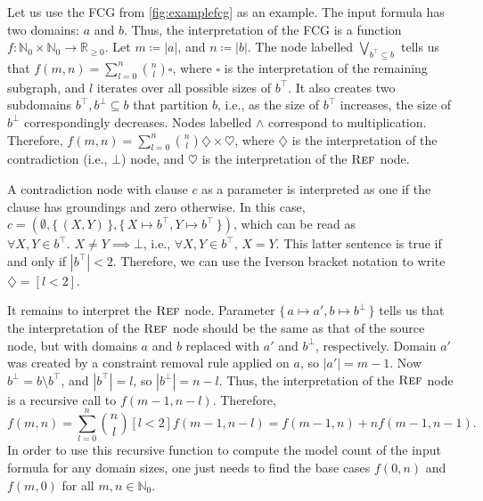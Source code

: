 \begin{example}\label{example:interpretation}
  Let us use the FCG from \cref{fig:examplefcg} as an example. The input formula
  has two domains: $a$ and $b$. Thus, the interpretation of the FCG is a
  function
  $f\colon \mathbb{N}_{0} \times \mathbb{N}_{0} \to \mathbb{R}_{\ge 0}$. Let
  $m \coloneqq |a|$, and $n \coloneqq |b|$. The node labelled
  $\bigvee_{b^{\top} \subseteq b}$ tells us that
  $f(m, n) = \sum_{l = 0}^{n} \binom{n}{l} \square$, where $\square$ is the
  interpretation of the remaining subgraph, and $l$ iterates over all possible
  sizes of $b^{\top}$. It also creates two subdomains
  $b^{\top}, b^{\bot} \subseteq b$ that partition $b$, i.e., as the size of
  $b^{\top}$ increases, the size of $b^{\bot}$ correspondingly decreases. Nodes
  labelled $\land$ correspond to multiplication. Therefore,
  $f(m, n) = \sum_{l = 0}^{n} \binom{n}{l} \diamondsuit \times \heartsuit$,
  where $\diamondsuit$ is the interpretation of the contradiction (i.e., $\bot$)
  node, and $\heartsuit$ is the interpretation of the $\operatorname{\textsc{Ref}}$ node.

  A contradiction node with clause $c$ as a parameter is interpreted as one if
  the clause has groundings and zero otherwise. In this case,
  $c = (\emptyset, \{\, (X, Y) \,\}, \{\, X \mapsto b^\top, Y \mapsto b^\top \,\})$,
  which can be read as $\forall X, Y \in b^{\top}\text{.
  }X \ne Y \implies \bot$, i.e., $\forall X, Y \in b^{\top}\text{, }X = Y$. This
  latter sentence is true if and only if $|b^{\top}| < 2$. Therefore, we can use
  the Iverson bracket notation to write $\diamondsuit = [l < 2]$.

  It remains to interpret the $\operatorname{\textsc{Ref}}$ node. Parameter
  $\{\, a \mapsto a', b \mapsto b^\bot \,\}$ tells us that the interpretation of
  the $\operatorname{\textsc{Ref}}$ node should be the same as that of the source node, but with
  domains $a$ and $b$ replaced with $a'$ and $b^{\bot}$, respectively. Domain
  $a'$ was created by a constraint removal rule applied on $a$, so
  $|a'| = m - 1$. Now $b^{\bot} = b \setminus b^{\top}$, and $|b^{\top}| = l$,
  so $|b^{\bot}| = n - l$. Thus, the interpretation of the $\operatorname{\textsc{Ref}}$ node is a
  recursive call to $f(m - 1, n - l)$. Therefore,
  \begin{equation}\label{eq:solution}
    f(m, n) = \sum_{l = 0}^{n} \binom{n}{l} [l < 2] f(m-1, n-l) = f(m-1, n) + n f(m-1, n-1).
  \end{equation}
  In order to use this recursive function to compute the model count of the
  input formula for any domain sizes, one just needs to find the base cases
  $f(0, n)$ and $f(m, 0)$ for all $m, n \in \mathbb{N}_{0}$.
\end{example}

